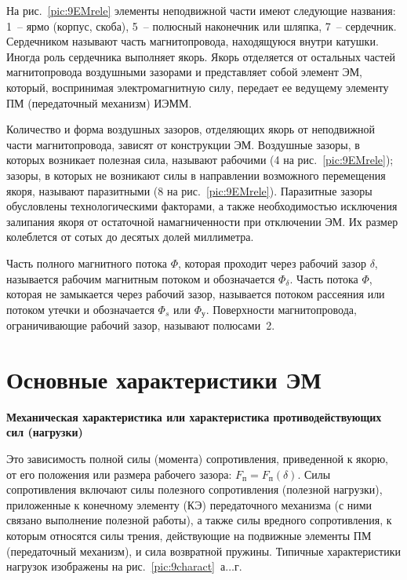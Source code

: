 На рис.~\ref{pic:9EMrele} элементы неподвижной части имеют следующие названия: 1~-- ярмо (корпус, скоба), 5~-- полюсный наконечник или шляпка, 7~-- сердечник. Сердечником называют часть магнитопровода, находящуюся внутри катушки. Иногда роль сердечника выполняет якорь. Якорь отделяется от остальных частей магнитопровода воздушными зазорами и представляет собой элемент ЭМ, который, воспринимая электромагнитную силу, передает ее ведущему элементу ПМ (передаточный механизм) ИЭММ. 

Количество и форма воздушных зазоров, отделяющих якорь от неподвижной части магнитопровода, зависят от конструкции ЭМ. Воздушные зазоры, в которых возникает полезная сила, называют рабочими (4 на рис.~\ref{pic:9EMrele}); зазоры, в которых не возникают силы в направлении возможного перемещения якоря, называют паразитными (8 на рис.~\ref{pic:9EMrele}). Паразитные зазоры обусловлены технологическими факторами, а также необходимостью исключения залипания якоря от остаточной намагниченности при отключении ЭМ. Их размер колеблется от сотых до десятых долей миллиметра.

Часть полного магнитного потока $ \Phi $, которая проходит через рабочий зазор $ \delta $, называется рабочим магнитным потоком и обозначается $ \Phi_\delta $. Часть потока $ \Phi $, которая не замыкается через рабочий зазор, называется потоком рассеяния или потоком утечки и обозначается $ \Phi_s $ или $ \Phi_\text{у} $. Поверхности магнитопровода, ограничивающие рабочий зазор, называют полюсами~2.

\section{Основные характеристики ЭМ}
\begin{flushleft}
\textbf{Механическая характеристика или характеристика противодействующих сил (нагрузки)}
\end{flushleft}
Это зависимость полной силы (момента) сопротивления, приведенной к якорю, от его положения или размера рабочего зазора: $ F_\text{п} = F_\text{п}(\delta) $. Силы сопротивления включают силы полезного сопротивления (полезной нагрузки), приложенные к конечному элементу (КЭ) передаточного механизма (с ними связано выполнение полезной работы), а также силы вредного сопротивления, к которым относятся силы трения, действующие на подвижные элементы ПМ (передаточный механизм), и сила возвратной пружины. Типичные характеристики нагрузок изображены на рис.~\ref{pic:9charact}~а$ \ldots $г.

